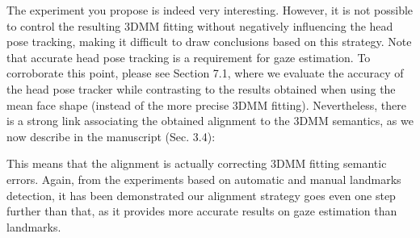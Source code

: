 {\noindent
The experiment you propose is indeed very interesting. However, it is not possible to control the resulting 3DMM fitting
without negatively influencing the head pose tracking, making it difficult to draw conclusions based on this strategy. Note that
accurate head pose tracking is a requirement for gaze estimation. To corroborate this point, please see Section 7.1,
where we evaluate the accuracy of the head pose tracker while contrasting to the results obtained when using the mean face shape
(instead of the more precise 3DMM fitting).
Nevertheless, there is a strong link associating the obtained alignment to the 3DMM semantics, as we now describe in the manuscript (Sec. 3.4):


\noindent
This means that the alignment is actually correcting 3DMM fitting semantic errors.
Again, from the experiments based on automatic and
manual landmarks detection, it has been demonstrated our alignment strategy goes even one step further than that,
as it provides more accurate results on gaze estimation than landmarks.






}

